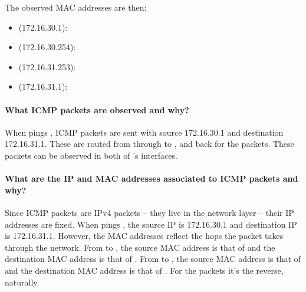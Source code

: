 \documentclass[compilation.tex]{subfiles}
\begin{document}
	The observed MAC addresses are then:
	\begin{itemize}[noitemsep,leftmargin=*,topsep=0pt]
		\item {} (172.16.30.1): 
		\item {} (172.16.30.254): 
		\item {} (172.16.31.253): 
		\item {} (172.16.31.1): 
	\end{itemize}
	
	\paragraph{What ICMP packets are observed and why?}
	When  pings , ICMP  packets are sent with source 172.16.30.1 and destination 172.16.31.1. These are routed from  through  to , and back for the  packets. These packets can be observed in both of 's interfaces.
	
	\paragraph{What are the IP and MAC addresses associated to ICMP packets and why?}
	Since ICMP packets are IPv4 packets -- they live in the network layer -- their IP addresses are fixed.
	When  pings , the source IP is 172.16.30.1 and destination IP is 172.16.31.1.
	However, the MAC addresses reflect the hops the packet takes through the network.
	From  to , the source MAC address is that of  and the destination MAC address is that of .
	From  to , the source MAC address is that of  and the destination MAC address is that of .
	For the  packets it's the reverse, naturally.
	
\end{document}

